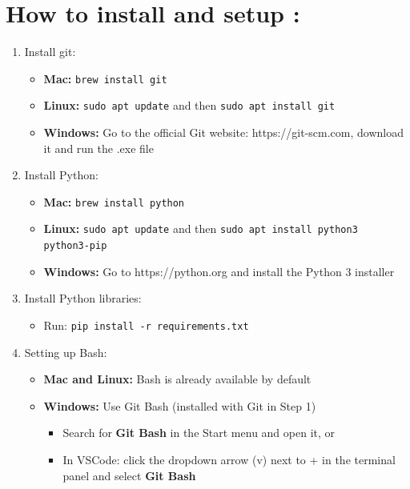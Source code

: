\documentclass{article}
\begin{document}
\section*{How to install and setup :}
\begin{enumerate}
    \item Install git:
    \begin{itemize}
        \item \textbf{Mac:} \texttt{brew install git}
        \item \textbf{Linux:} \texttt{sudo apt update} and then \texttt{sudo apt install git}
        \item \textbf{Windows:} Go to the official Git website: https://git-scm.com, download it and run the .exe file
    \end{itemize}

    \item Install Python:
    \begin{itemize}
        \item \textbf{Mac:} \texttt{brew install python}
        \item \textbf{Linux:} \texttt{sudo apt update} and then \texttt{sudo apt install python3 python3-pip}
        \item \textbf{Windows:} Go to https://python.org and install the Python 3 installer
    \end{itemize}

    \item Install Python libraries:
    \begin{itemize}
        \item Run: \texttt{pip install -r requirements.txt}
    \end{itemize}

    \item Setting up Bash:
    \begin{itemize}
        \item \textbf{Mac and Linux:} Bash is already available by default
        \item \textbf{Windows:} Use Git Bash (installed with Git in Step 1)
        \begin{itemize}
            \item Search for \textbf{Git Bash} in the Start menu and open it, or
            \item In VSCode: click the dropdown arrow (v) next to + in the terminal panel and select \textbf{Git Bash}
        \end{itemize}
    \end{itemize}


\end{enumerate}
\end{document}
